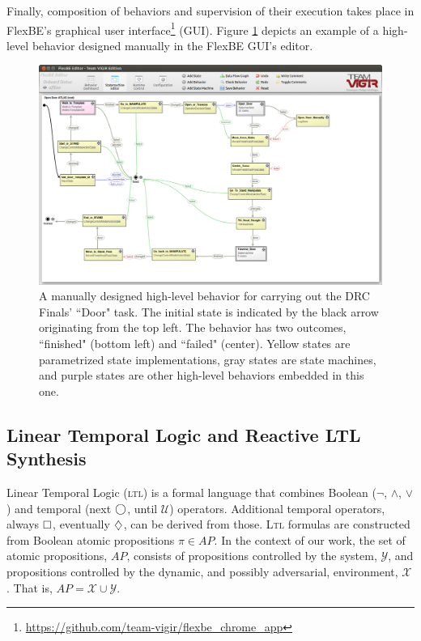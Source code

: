 Finally, composition of behaviors and supervision of their execution takes place in FlexBE's graphical user interface\footnote{\scriptsize{\url{https://github.com/team-vigir/flexbe_chrome_app}}} (GUI).
Figure \ref{Fig:FlexBESM} depicts an example of a high-level behavior designed manually in the FlexBE GUI's editor.

\begin{figure}[t]
\centering
\includegraphics[width=0.99\columnwidth,clip]{./img/behavior_open_door.png}
\caption{A manually designed high-level behavior for carrying out the DRC Finals' ``Door" task.
The initial state is indicated by the black arrow originating from the top left.
The behavior has two outcomes, ``finished" (bottom left) and ``failed" (center).
Yellow states are parametrized state implementations, gray states are state machines, and purple states are other high-level behaviors embedded in this one.
}
\label{Fig:FlexBESM}
\end{figure}

\subsection{Linear Temporal Logic and Reactive LTL Synthesis}\label{S:GR1}

Linear Temporal Logic (\textsc{ltl}) is a formal language that combines Boolean ($\lnot$, $\wedge$, $\lor$) and temporal (next $\operatorname{\bigcirc}$, until $\mathcal{U}$) operators.
Additional temporal operators, always $\operatorname{\Box}$, eventually $\operatorname{\diamondsuit}$, can be derived from those.
\textsc{Ltl} formulas are constructed from Boolean atomic propositions $\pi \in AP$.
In the context of our work, the set of atomic propositions, $AP$, consists of propositions controlled by the system, $\mathcal{Y}$, and propositions controlled by the dynamic, and possibly adversarial, environment, $\mathcal{X}$. That is, $AP = \mathcal{X} \cup \mathcal{Y}$.

